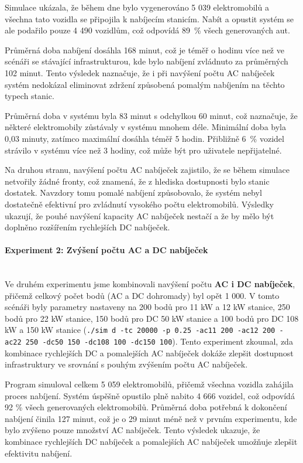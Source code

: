 \documentclass[a4paper,11pt]{article}
\begin{document}
Simulace ukázala, že během dne bylo vygenerováno 5 039 elektromobilů a všechna tato vozidla se připojila k nabíjecím stanicím. Nabít a opustit systém se ale podařilo pouze 4 490 vozidlům, což odpovídá 89~\% všech generovaných aut.

Průměrná doba nabíjení dosáhla 168 minut, což je téměř o hodinu více než ve scénáři se stávající infrastrukturou, kde bylo nabíjení zvládnuto za průměrných 102 minut. Tento výsledek naznačuje, že i při navýšení počtu AC nabíječek systém nedokázal eliminovat zdržení způsobená pomalým nabíjením na těchto typech stanic.

Průměrná doba v systému byla 83 minut s odchylkou 60 minut, což naznačuje, že některé elektromobily zůstávaly v systému mnohem déle. Minimální doba byla 0,03 minuty, zatímco maximální dosáhla téměř 5 hodin. Přibližně 6~\% vozidel strávilo v systému více než 3 hodiny, což může být pro uživatele nepřijatelné.

Na druhou stranu, navýšení počtu AC nabíječek zajistilo, že se během simulace netvořily žádné fronty, což znamená, že z hlediska dostupnosti bylo stanic dostatek. Navzdory tomu pomalé nabíjení způsobovalo, že systém nebyl dostatečně efektivní pro zvládnutí vysokého počtu elektromobilů. Výsledky ukazují, že pouhé navýšení kapacity AC nabíječek nestačí a že by mělo být doplněno rozšířením rychlejších DC nabíječek.


\paragraph{Experiment 2: Zvýšení počtu AC a DC nabíječek\\\\}
Ve druhém experimentu jsme kombinovali navýšení počtu \textbf{AC i DC nabíječek}, přičemž celkový počet bodů (AC a DC dohromady) byl opět 1 000. V tomto scénáři byly parametry nastaveny na 200 bodů pro 11 kW a 12 kW stanice, 250 bodů pro 22 kW stanice, 150 bodů pro DC 50 kW stanice a 100 bodů pro DC 108 kW a 150 kW stanice (\texttt{./sim d -tc 20000 -p 0.25 -ac11 200 -ac12 200 -ac22 250 -dc50 150 -dc108 100 -dc150 100}). Tento experiment zkoumal, zda kombinace rychlejších DC a pomalejších AC nabíječek dokáže zlepšit dostupnost infrastruktury ve srovnání s pouhým zvýšením počtu AC nabíječek.

Program simuloval celkem 5 059 elektromobilů, přičemž všechna vozidla zahájila proces nabíjení. Systém úspěšně opustilo plně nabito 4 666 vozidel, což odpovídá 92 \% všech generovaných elektromobilů. Průměrná doba potřebná k dokončení nabíjení činila 127 minut, což je o 29 minut méně než v prvním experimentu, kde bylo zvýšeno pouze množství AC nabíječek. Tento výsledek ukazuje, že kombinace rychlejších DC nabíječek a pomalejších AC nabíječek umožňuje zlepšit efektivitu nabíjení.
\end{document}
